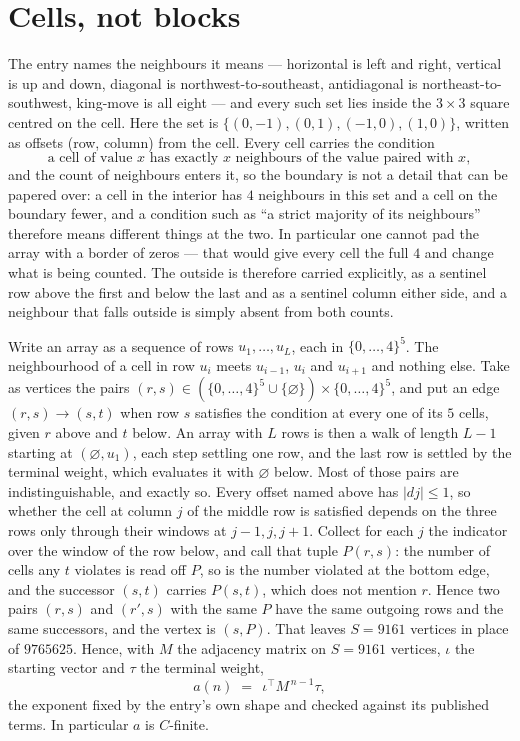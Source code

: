 \documentclass[11pt,a4paper]{article}
\theoremstyle{plain}
\theoremstyle{definition}
\begin{document}
\section{Cells, not blocks}

The entry names the neighbours it means --- horizontal is left and right, vertical is up and
down, diagonal is northwest-to-southeast, antidiagonal is northeast-to-southwest, king-move is
all eight --- and every such set lies inside the $3\times3$ square centred on the cell. Here
the set is $\{(0,-1), (0,1), (-1,0), (1,0)\}$, written as offsets (row, column) from the cell. Every cell carries
the condition
\[
\text{a cell of value }x\text{ has exactly }x\text{ neighbours of the value paired with }x,
\]
and the count of neighbours enters it, so the boundary is not a detail that can be papered
over: a cell in the interior has $4$ neighbours in this set and a cell on the boundary
fewer, and a condition such as ``a strict majority of its neighbours'' therefore means
different things at the two. In particular one cannot pad the array with a border of zeros ---
that would give every cell the full $4$ and change what is being counted. The outside is
therefore carried
explicitly, as a sentinel row above the first and below the last and as a sentinel column
either side, and a neighbour that falls outside is simply absent from both counts.

Write an array as a sequence of rows $u_1,\dots,u_L$, each in
$\{0,\dots,4\}^{5}$. The neighbourhood of a cell in row $u_i$ meets $u_{i-1}$,
$u_i$ and $u_{i+1}$ and nothing else. Take as vertices the pairs
$(r,s)\in(\{0,\dots,4\}^{5}\cup\{\varnothing\})\times\{0,\dots,4\}^{5}$,
and put an edge $(r,s)\to(s,t)$ when row $s$ satisfies the condition at every one of its
$5$ cells, given $r$ above and $t$ below. An array with $L$ rows is then a walk of length
$L-1$ starting at $(\varnothing,u_1)$, each step settling one row, and the last row is
settled by the terminal weight, which evaluates it with $\varnothing$ below. Most of those pairs are indistinguishable, and exactly so. Every offset named above has $|dj|\le 1$, so whether the cell at column $j$ of the middle row is satisfied depends on the three rows only through their windows at $j-1,j,j+1$. Collect for each $j$ the indicator over the window of the row below, and call that tuple $P(r,s)$: the number of cells any $t$ violates is read off $P$, so is the number violated at the bottom edge, and the successor $(s,t)$ carries $P(s,t)$, which does not mention $r$. Hence two pairs $(r,s)$ and $(r',s)$ with the same $P$ have the same outgoing rows and the same successors, and the vertex is $(s,P)$. That leaves $S=9161$ vertices in place of $9765625$. Hence,
with $M$ the adjacency matrix on $S=9161$ vertices, $\iota$ the starting vector and $\tau$ the
terminal weight,
\[
a(n)\;=\;\,\iota^{\!\top}M^{\,n-1}\tau ,
\]
the exponent fixed by the entry's own shape and checked against its published terms. In
particular $a$ is $C$-finite.
\end{document}
